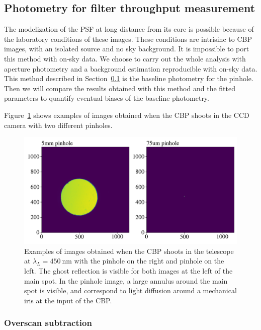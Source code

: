 \subsection{Photometry for filter throughput measurement}
\label{sec:photometry_small}

The modelization of the PSF at long distance from its core is possible because of the laboratory conditions of these images. These conditions are intrisinc to CBP images, with an isolated source and no sky background. It is impossible to port this method with on-sky data. We choose to carry out the whole analysis with aperture photometry and a background estimation reproducible with on-sky data. This method described in Section~\ref{sec:photometry_small} is the baseline photometry for the \spinhole pinhole. Then we will compare the results obtained with this method and the fitted parameters to quantify eventual biases of the baseline photometry.

Figure~\ref{fig:ccd_examples} shows examples of images obtained when the CBP shoots in the \SD CCD camera with two different pinholes. 

\begin{figure}[h]
    \centering
    \includegraphics[width=\columnwidth]{fig/ccd_examples.pdf}
    \caption{Examples of images obtained when the CBP shoots in the \SD telescope at $\lambda_L=\SI{450}{\nm}$ with the \bpinhole pinhole on the right and \spinhole pinhole on the left. The ghost reflection is visible for both images at the left of the main spot. In the \bpinhole pinhole image, a large annulus around the main spot is visible, and correspond to light diffusion around a mechanical iris at the input of the CBP.}
    \label{fig:ccd_examples}
\end{figure}

\subsubsection{Overscan subtraction}

